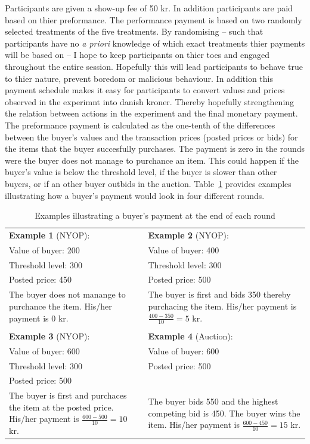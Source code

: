 \documentclass[a4paper,12pt]{article}
\begin{document}
	Participants are given a show-up fee of 50 kr. In addition participants are paid based on thier preformance. The performance payment is based on two randomly selected treatments of the five treatments. By randomising -- such that participants have no \emph{a priori} knowledge of which exact treatments thier payments will be based on -- I hope to keep participants on thier toes and engaged throughout the entire session. Hopefully this will lead participants to behave true to thier nature, prevent boredom or malicious behaviour. In addition this payment schedule makes it easy for participants to convert values and prices observed in the experimnt into danish kroner. Thereby hopefully strengthening the relation between actions in the experiment and the final monetary payment. The preformance payment is calculated as the one-tenth of the differences between the buyer's values and the transaction prices (posted prices or bids) for the items that the buyer succesfully purchases. The payment is zero in the rounds were the buyer does not manage to purchance an item. This could happen if the buyer's value is below the threshold level, if the buyer is slower than other buyers, or if an other buyer outbids in the auction. Table~\ref{tab:payment} provides examples illustrating how a buyer's payment would look in four different rounds.
	
	\begin{table}[ht]
		\caption{Examples illustrating a buyer's payment at the end of each round}
		\begin{tabular}{p{}  p{}}
			{\bf Example 1} (NYOP): 	& {\bf Example 2} (NYOP):  		\\
			Value of buyer: 200 		& Value of buyer: 400 			\\
			Threshold level: 300 		& Threshold level: 300 			\\
			Posted price: 450 			& Posted price: 500 			\\
			The buyer does not manange to purchance the item. His/her payment is 0 kr. & The buyer is first and bids 350 thereby purchacing the item. His/her payment is $\frac{400-350}{10}=5$ kr. \\
			\multicolumn{2}{c}{} \\
			{\bf Example 3} (NYOP):  	& {\bf Example 4} (Auction): 	\\
			Value of buyer: 600 		& Value of buyer: 600  			\\
			Threshold level: 300  		& Posted price: 500  			\\
			Posted price: 500  			&  								\\
			The buyer is first and purchaces the item at the posted price. His/her payment is $\frac{600-500}{10}=10$ kr. & The buyer bids 550 and the highest competing bid is 450. The buyer wins the item. His/her payment is $\frac{600-450}{10}=15$ kr. \\
		\end{tabular}
		\label{tab:payment}
	\end{table}
	
\end{document}
